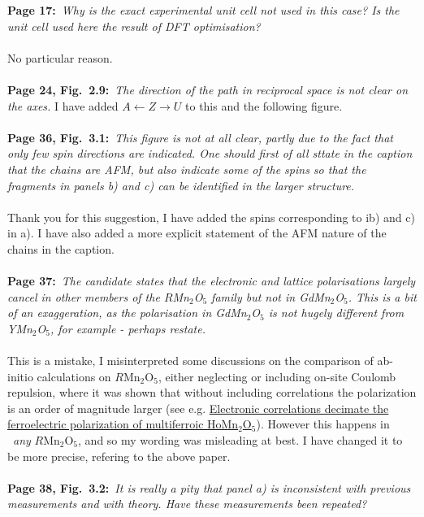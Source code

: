 \documentclass[a4, UTF8]{article}
\begin{document}
{\bf Page 17:}~{\it Why is the exact experimental unit cell not used in this case? Is the unit cell used here the result of DFT optimisation?}
\\\\
No particular reason.
\\\\
{\bf Page 24, Fig.~2.9:}~{\it The direction of the path in reciprocal space is not clear on the axes.}
I have added $A \leftarrow Z \rightarrow U$ to this and the following figure.
\\\\
{\bf Page 36, Fig.~3.1:}~{\it This figure is not at all clear, partly due to the fact that only few spin directions are indicated. One should first of all sttate in the caption that the chains are AFM, but also indicate some of the spins so that the fragments in panels b) and c) can be identified in the larger structure.}
\\\\
Thank you for this suggestion, I have added the spins corresponding to ib) and c) in a).
I have also added a more explicit statement of the AFM nature of the chains in the caption.
\\\\
{\bf Page 37:}~{\it The candidate states that the electronic and lattice polarisations largely cancel in other members of the $R$Mn$_2$O$_5$ family but not in GdMn$_2$O$_5$. This is a bit of an exaggeration, as the polarisation in GdMn$_2$O$_5$ is not hugely different from YMn$_2$O$_5$, for example - perhaps restate.}
\\\\
This is a mistake, I misinterpreted some discussions on the comparison of ab-initio calculations on $R$Mn$_2$O$_5$, either neglecting or including on-site Coulomb repulsion, where it was shown that without including correlations the polarization is an order of magnitude larger (see e.g. \href{https://arxiv.org/abs/0802.0653v1}{Electronic correlations decimate the ferroelectric polarization of multiferroic HoMn$_2$O$_5$}). However this happens in ~{\it any} $R$Mn$_2$O$_5$, and so my wording was misleading at best. I have changed it to be more precise, refering to the above paper. 
\\\\
{\bf Page 38, Fig.~3.2:}~{\it It is really a pity that panel a) is inconsistent with previous measurements and with theory. Have these measurements been repeated?}
\\\\
\end{document}
